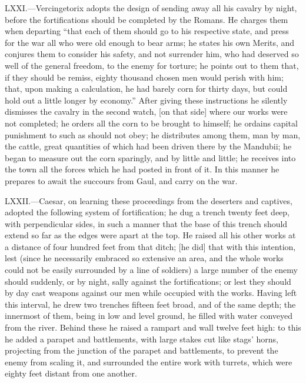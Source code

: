 LXXI.—Vercingetorix adopts the design of sending away all his cavalry
by night, before the fortifications should be completed by the Romans.
He charges them when departing ``that each of them should go to his
respective state, and press for the war all who were old enough to bear
arms; he states his own Merits, and conjures them to consider his
safety, and not surrender him, who had deserved so well of the general
freedom, to the enemy for torture; he points out to them that, if they
should be remiss, eighty thousand chosen men would perish with him;
that, upon making a calculation, he had barely corn for thirty days, but
could hold out a little longer by economy.'' After giving these
instructions he silently dismisses the cavalry in the second watch, [on
that side] where our works were not completed; he orders all the corn to
be brought to himself; he ordains capital punishment to such as should
not obey; he distributes among them, man by man, the cattle, great
quantities of which had been driven there by the Mandubii; he began to
measure out the corn sparingly, and by little and little; he receives
into the town all the forces which he had posted in front of it. In this
manner he prepares to await the succours from Gaul, and carry on the
war.

LXXII.—Caesar, on learning these proceedings from the deserters and
captives, adopted the following system of fortification; he dug a trench
twenty feet deep, with perpendicular sides, in such a manner that the
base of this trench should extend so far as the edges were apart at the
top. He raised all his other works at a distance of four hundred feet
from that ditch; [he did] that with this intention, lest (since he
necessarily embraced so extensive an area, and the whole works could not
be easily surrounded by a line of soldiers) a large number of the enemy
should suddenly, or by night, sally against the fortifications; or lest
they should by day cast weapons against our men while occupied with the
works. Having left this interval, he drew two trenches fifteen feet
broad, and of the same depth; the innermost of them, being in low and
level ground, he filled with water conveyed from the river. Behind these
he raised a rampart and wall twelve feet high: to this he added a
parapet and battlements, with large stakes cut like stags' horns,
projecting from the junction of the parapet and battlements, to prevent
the enemy from scaling it, and surrounded the entire work with turrets,
which were eighty feet distant from one another.

